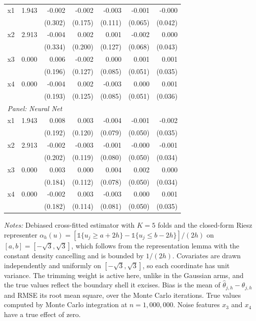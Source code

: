 \documentclass[12pt,a4paper]{article}
\numberwithin{equation}{section}
\theoremstyle{plain}
\theoremstyle{definition}
\begin{document}
\begin{table}[htbp]
\begin{threeparttable}
\begin{tabular}{lrrrrrr}
				\quad x1 & 1.943 & -0.002 & -0.002 & -0.003 & -0.001 & -0.000 \\
				&  & (0.302) & (0.175) & (0.111) & (0.065) & (0.042) \\
				\quad x2 & 2.913 & -0.004 & 0.002 & 0.001 & -0.002 & 0.000 \\
				&  & (0.334) & (0.200) & (0.127) & (0.068) & (0.043) \\
				\quad x3 & 0.000 & 0.006 & -0.002 & 0.000 & 0.001 & 0.001 \\
				&  & (0.196) & (0.127) & (0.085) & (0.051) & (0.035) \\
				\quad x4 & 0.000 & -0.004 & 0.002 & -0.003 & 0.000 & 0.001 \\
				&  & (0.193) & (0.125) & (0.085) & (0.051) & (0.036) \\
				\midrule
				\multicolumn{7}{l}{\textit{Panel: Neural Net}} \\
				\quad x1 & 1.943 & 0.008 & 0.003 & -0.004 & -0.001 & -0.002 \\
				&  & (0.192) & (0.120) & (0.079) & (0.050) & (0.035) \\
				\quad x2 & 2.913 & -0.002 & -0.003 & -0.001 & -0.000 & -0.001 \\
				&  & (0.202) & (0.119) & (0.080) & (0.050) & (0.034) \\
				\quad x3 & 0.000 & 0.003 & 0.000 & 0.004 & 0.002 & 0.000 \\
				&  & (0.184) & (0.112) & (0.078) & (0.050) & (0.034) \\
				\quad x4 & 0.000 & -0.002 & 0.003 & -0.003 & 0.000 & 0.001 \\
				&  & (0.182) & (0.114) & (0.081) & (0.050) & (0.035) \\
				\bottomrule
				\end{tabular}
				\begin{tablenotes}
				\footnotesize
				\item \textit{Notes:} Debiased cross-fitted estimator with $K=5$ folds and the closed-form Riesz representer $\alpha_h(u) = [\mathbb{1}\{u_j \geq a + 2h\} - \mathbb{1}\{u_j \leq b - 2h\}]/(2h)$ on $[a,b] = [-\sqrt{3},\sqrt{3}]$, which follows from the representation lemma with the constant density cancelling and is bounded by $1/(2h)$. Covariates are drawn independently and uniformly on $[-\sqrt{3},\sqrt{3}]$, so each coordinate has unit variance. The trimming weight is active here, unlike in the Gaussian arms, and the true values reflect the boundary shell it excises. Bias is the mean of $\hat{\theta}_{j,h} - \theta_{j,h}$ and RMSE its root mean square, over the Monte Carlo iterations. True values computed by Monte Carlo integration at $n=1{,}000{,}000$. Noise features $x_3$ and $x_4$ have a true effect of zero.
				\end{tablenotes}
		\end{threeparttable}
	\end{table}
\end{document}
